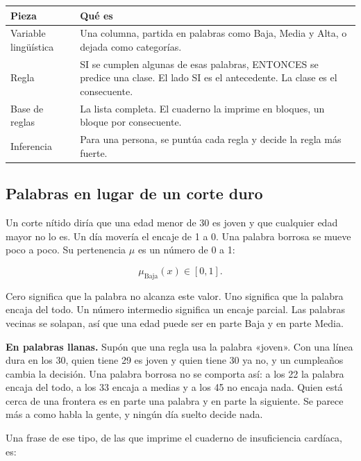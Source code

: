 \documentclass[11pt]{article}
\begin{document}
\begin{table}[H]
\centering
\small
\begin{tabularx}{\textwidth}{@{}l Y@{}}
\toprule
Pieza & Qué es \\
\midrule
Variable lingüística & Una columna, partida en palabras como Baja, Media y Alta, o dejada como categorías. \\
Regla & SI se cumplen algunas de esas palabras, ENTONCES se predice una clase. El lado SI es el antecedente. La clase es el consecuente. \\
Base de reglas & La lista completa. El cuaderno la imprime en bloques, un bloque por consecuente. \\
Inferencia & Para una persona, se puntúa cada regla y decide la regla más fuerte. \\
\bottomrule
\end{tabularx}
\end{table}

\subsection{Palabras en lugar de un corte duro}

Un corte nítido diría que una edad menor de 30 es joven y que cualquier edad mayor no lo es. Un día movería el encaje de 1 a 0. Una palabra borrosa se mueve poco a poco. Su pertenencia \(\mu\) es un número de 0 a 1:

\[
\mu_{\mathrm{Baja}}(x) \in [0, 1].
\]

Cero significa que la palabra no alcanza este valor. Uno significa que la palabra encaja del todo. Un número intermedio significa un encaje parcial. Las palabras vecinas se solapan, así que una edad puede ser en parte Baja y en parte Media.

\begin{plainwords}
\textbf{En palabras llanas.} Supón que una regla usa la palabra «joven». Con una línea dura en los 30, quien tiene 29 es joven y quien tiene 30 ya no, y un cumpleaños cambia la decisión. Una palabra borrosa no se comporta así: a los 22 la palabra encaja del todo, a los 33 encaja a medias y a los 45 no encaja nada. Quien está cerca de una frontera es en parte una palabra y en parte la siguiente. Se parece más a como habla la gente, y ningún día suelto decide nada.
\end{plainwords}

Una frase de ese tipo, de las que imprime el cuaderno de insuficiencia cardíaca, es:
\end{document}

